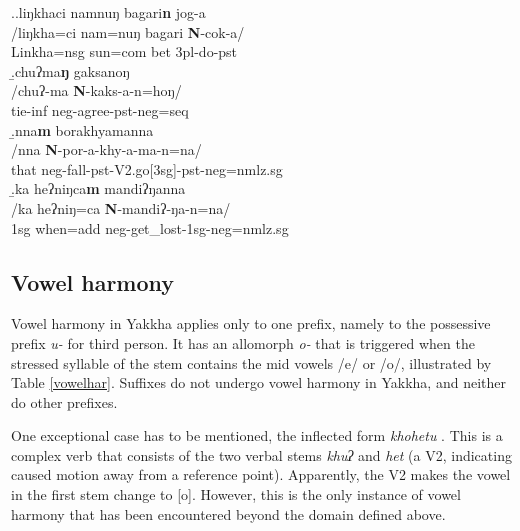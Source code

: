 \ex.\a.\glll liŋkhaci namnuŋ bagari\textbf{n} jog-a\\
/liŋkha=ci     nam=nuŋ      bagari {\bf N}-cok-a/\\
Linkha{\sc =nsg} sun{\sc =com} bet {\sc 3pl-}do{\sc -pst}		\\
 
\b.\glll  chuʔma\textbf{ŋ} gaksanoŋ\\
/chuʔ-ma  {\bf N}-kaks-a-n=hoŋ/\\
tie{\sc -inf} {\sc neg-}agree{\sc [3sg]-pst-neg=seq}\\
  
\b.\glll  nna\textbf{m} borakhyamanna\\
 /nna {\bf N}-por-a-khy-a-ma-n=na/\\
that {\sc neg-}fall{\sc -pst-V2.go[3sg]-pst-neg=nmlz.sg}\\
 
\b.\glll  ka heʔniŋca\textbf{m} mandiʔŋanna\\
/ka heʔniŋ=ca {\bf N}-mandiʔ-ŋa-n=na/\\
{\sc 1sg} when{\sc =add} {\sc neg-}get\_lost{\sc -1sg-neg=nmlz.sg}\\
					
			
			
\subsection{Vowel harmony}\label{vow-har}

Vowel harmony in Yakkha applies only to one prefix, namely to the possessive prefix  \emph{u-} for third person. It has an allomorph \emph{o-} that is triggered when the stressed syllable of the stem contains the mid vowels /e/ or /o/, illustrated by Table \ref{vowelhar}. Suffixes do not  undergo vowel harmony in Yakkha, and neither do other prefixes. 

One  exceptional case has to be mentioned, the inflected form \emph{khohetu} . This is a complex verb that consists of the two verbal stems \emph{khuʔ}  and \emph{het} (a V2, indicating caused motion away from a reference point). Apparently, the V2 makes the vowel in the first stem change to [o]. However, this is the only instance of vowel harmony that has been encountered beyond the domain defined above.



